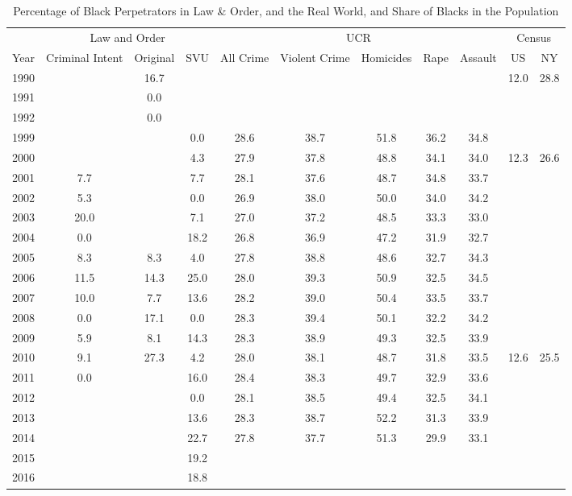 \begin{table}[!htb]
\centering
\caption{Percentage of Black Perpetrators in Law \& Order, and the Real World, and Share of Blacks in the Population} 
\label{tab:c_race}
\begingroup\tiny
\begin{tabular}{ccccccccccc}
  \toprule
   & \multicolumn{3}{c}{{Law and Order}} & \multicolumn{5}{c}{{UCR}} & \multicolumn{2}{c}{{Census}}\\
 \cmidrule(lr){2-4}\cmidrule(lr){5-9}\cmidrule(lr){10-11}
 {Year} & {Criminal Intent} & {Original} & {SVU} & {All Crime} & {Violent Crime} & {Homicides} & {Rape} & {Assault} & {US} & {NY}\\
 \midrule
1990 &  & 16.7 &  &  &  &  &  &  & 12.0 & 28.8 \\ 
  1991 &  & 0.0 &  &  &  &  &  &  &  &  \\ 
  1992 &  & 0.0 &  &  &  &  &  &  &  &  \\ 
  1999 &  &  & 0.0 & 28.6 & 38.7 & 51.8 & 36.2 & 34.8 &  &  \\ 
  2000 &  &  & 4.3 & 27.9 & 37.8 & 48.8 & 34.1 & 34.0 & 12.3 & 26.6 \\ 
  2001 & 7.7 &  & 7.7 & 28.1 & 37.6 & 48.7 & 34.8 & 33.7 &  &  \\ 
  2002 & 5.3 &  & 0.0 & 26.9 & 38.0 & 50.0 & 34.0 & 34.2 &  &  \\ 
  2003 & 20.0 &  & 7.1 & 27.0 & 37.2 & 48.5 & 33.3 & 33.0 &  &  \\ 
  2004 & 0.0 &  & 18.2 & 26.8 & 36.9 & 47.2 & 31.9 & 32.7 &  &  \\ 
  2005 & 8.3 & 8.3 & 4.0 & 27.8 & 38.8 & 48.6 & 32.7 & 34.3 &  &  \\ 
  2006 & 11.5 & 14.3 & 25.0 & 28.0 & 39.3 & 50.9 & 32.5 & 34.5 &  &  \\ 
  2007 & 10.0 & 7.7 & 13.6 & 28.2 & 39.0 & 50.4 & 33.5 & 33.7 &  &  \\ 
  2008 & 0.0 & 17.1 & 0.0 & 28.3 & 39.4 & 50.1 & 32.2 & 34.2 &  &  \\ 
  2009 & 5.9 & 8.1 & 14.3 & 28.3 & 38.9 & 49.3 & 32.5 & 33.9 &  &  \\ 
  2010 & 9.1 & 27.3 & 4.2 & 28.0 & 38.1 & 48.7 & 31.8 & 33.5 & 12.6 & 25.5 \\ 
  2011 & 0.0 &  & 16.0 & 28.4 & 38.3 & 49.7 & 32.9 & 33.6 &  &  \\ 
  2012 &  &  & 0.0 & 28.1 & 38.5 & 49.4 & 32.5 & 34.1 &  &  \\ 
  2013 &  &  & 13.6 & 28.3 & 38.7 & 52.2 & 31.3 & 33.9 &  &  \\ 
  2014 &  &  & 22.7 & 27.8 & 37.7 & 51.3 & 29.9 & 33.1 &  &  \\ 
  2015 &  &  & 19.2 &  &  &  &  &  &  &  \\ 
  2016 &  &  & 18.8 &  &  &  &  &  &  &  \\ 
   \bottomrule
\end{tabular}
\endgroup
\end{table}
